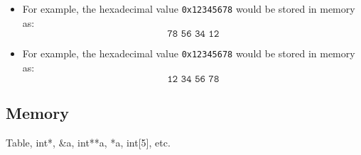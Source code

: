 \begin{example}
    \begin{itemize}
        \item For example, the hexadecimal value \texttt{0x12345678} would be stored in memory as:
        \[
        \texttt{78 56 34 12}
        \]
        \item For example, the hexadecimal value \texttt{0x12345678} would be stored in memory as:
        \[
        \texttt{12 34 56 78}
        \]
    \end{itemize}
\end{example}

\subsection{Memory}
\begin{summary}
    Table, int*, \&a, int**a, *a, int[5], etc. 
\end{summary}